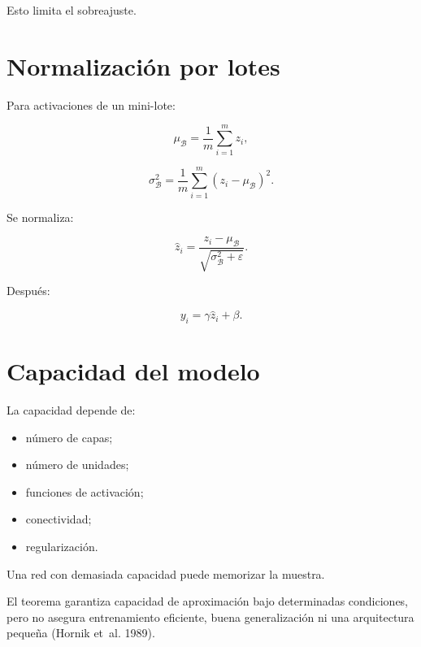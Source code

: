 \documentclass[
  spanish,
  10.5pt,
  letterpaper,
  DIV=11,
  numbers=noendperiod,
  oneside,
  open=any]{scrreprt}
\providecommand{\tightlist}{%
  \setlength{\itemsep}{0pt}\setlength{\parskip}{0pt}}
\theoremstyle{definition}
\theoremstyle{definition}
\theoremstyle{plain}
\theoremstyle{remark}
\begin{document}
Esto limita el sobreajuste.

\section*{Normalización por lotes}\label{normalizaciuxf3n-por-lotes}


Para activaciones de un mini-lote:

\[
\mu_{\mathcal{B}}
=
\frac{1}{m}
\sum_{i=1}^{m}
z_i,
\]

\[
\sigma_{\mathcal{B}}^2
=
\frac{1}{m}
\sum_{i=1}^{m}
(z_i-\mu_{\mathcal{B}})^2.
\]

Se normaliza:

\[
\widehat{z}_i
=
\frac{
z_i-\mu_{\mathcal{B}}
}{
\sqrt{
\sigma_{\mathcal{B}}^2+\varepsilon
}
}.
\]

Después:

\[
y_i
=
\gamma\widehat{z}_i+\beta.
\]

\section*{Capacidad del modelo}\label{capacidad-del-modelo}


La capacidad depende de:

\begin{itemize}
\tightlist
\item
  número de capas;
\item
  número de unidades;
\item
  funciones de activación;
\item
  conectividad;
\item
  regularización.
\end{itemize}

Una red con demasiada capacidad puede memorizar la muestra.

\begin{tcolorbox}[enhanced jigsaw, arc=.35mm, bottomrule=.15mm, bottomtitle=1mm, breakable, colback=white, colbacktitle=quarto-callout-warning-color!10!white, colframe=quarto-callout-warning-color-frame, coltitle=black, left=2mm, leftrule=.75mm, opacityback=0, opacitybacktitle=0.6, rightrule=.15mm, title=\textcolor{quarto-callout-warning-color}{\faExclamationTriangle}\hspace{0.5em}{Alcance del teorema universal}, titlerule=0mm, toprule=.15mm, toptitle=1mm]

El teorema garantiza capacidad de aproximación bajo determinadas
condiciones, pero no asegura entrenamiento eficiente, buena
generalización ni una arquitectura pequeña (Hornik et~al. 1989).

\end{tcolorbox}
\end{document}
